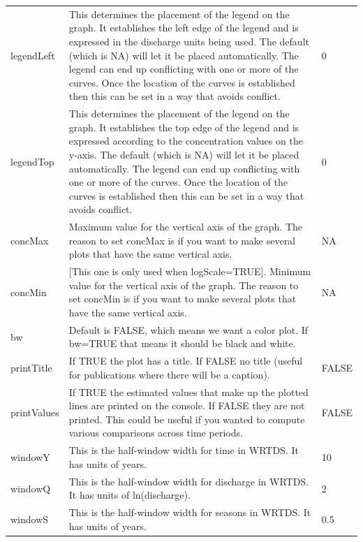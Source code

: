 \documentclass[a4paper,11pt]{article}\usepackage[]{graphicx}\usepackage[]{color}
\begin{document}
\begin{table}[ht]
\begin{tabularx}{\textwidth}{lXl}
legendLeft & This determines the placement of the legend on the graph.  It establishes the left edge of the legend and is expressed in the discharge units being used.  The default (which is NA) will let it be placed automatically.  The legend can end up conflicting with one or more of the curves.  Once the location of the curves is established then this can be set in a way that avoids conflict. & 0\\
legendTop & This determines the placement of the legend on the graph.  It establishes the top edge of the legend and is expressed according to the concentration values on the y-axis.  The default (which is NA) will let it be placed automatically.  The legend can end up conflicting with one or more of the curves.  Once the location of the curves is established then this can be set in a way that avoids conflict. & 0\\
concMax & Maximum value for the vertical axis of the graph.  The reason to set concMax is if you want to make several plots that have the same vertical axis. & NA\\
concMin & [This one is only used when logScale=TRUE].  Minimum value for the vertical axis of the graph. The reason to set concMin is if you want to make several plots that have the same vertical axis. & NA\\
bw & Default is FALSE, which means we want a color plot.  If bw=TRUE that means it should be black and white.\\
printTitle & If TRUE the plot has a title.  If FALSE no title (useful for publications where there will be a caption). & FALSE\\
printValues & If TRUE the estimated values that make up the plotted lines are printed on the console.  If FALSE they are not printed.  This could be useful if you wanted to compute various comparisons across time periods. & FALSE\\
windowY & This is the half-window width for time in WRTDS.  It has units of years.  & 10 \\
windowQ & This is the half-window width for discharge in WRTDS.  It has units of ln(discharge).  & 2 \\
windowS & This is the half-window width for seasons in WRTDS.  It has units of years.  & 0.5 \\
\hline
\end{tabularx}

\end{table}

\FloatBarrier
\end{document}
